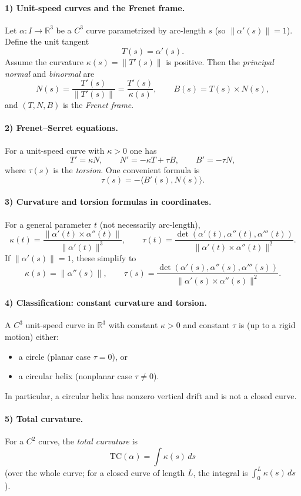 \documentclass[12pt,a4paper]{article}
\theoremstyle{plain}
\theoremstyle{definition}      %
\begin{document}
	\paragraph{1) Unit-speed curves and the Frenet frame.}
	Let $\alpha:I\to\mathbb{R}^3$ be a $C^3$ curve parametrized by arc-length $s$ (so $\|\alpha'(s)\|=1$).
	Define the unit tangent
	\[
	T(s)=\alpha'(s).
	\]
	Assume the curvature $\kappa(s)=\|T'(s)\|$ is positive. Then the \emph{principal normal} and \emph{binormal} are
	\[
	N(s)=\frac{T'(s)}{\|T'(s)\|}=\frac{T'(s)}{\kappa(s)},
	\qquad
	B(s)=T(s)\times N(s),
	\]
	and $(T,N,B)$ is the \emph{Frenet frame}.
	
	\paragraph{2) Frenet--Serret equations.}
	For a unit-speed curve with $\kappa>0$ one has
	\[
	T'=\kappa N,\qquad
	N'=-\kappa T+\tau B,\qquad
	B'=-\tau N,
	\]
	where $\tau(s)$ is the \emph{torsion}. One convenient formula is
	\[
	\tau(s) = -\langle B'(s),N(s)\rangle.
	\]
	
	\paragraph{3) Curvature and torsion formulas in coordinates.}
	For a general parameter $t$ (not necessarily arc-length),
	\[
	\kappa(t)=\frac{\|\alpha'(t)\times\alpha''(t)\|}{\|\alpha'(t)\|^3},
	\qquad
	\tau(t)=\frac{\det(\alpha'(t),\alpha''(t),\alpha'''(t))}{\|\alpha'(t)\times\alpha''(t)\|^2}.
	\]
	If $\|\alpha'(s)\|=1$, these simplify to
	\[
	\kappa(s)=\|\alpha''(s)\|,
	\qquad
	\tau(s)=\frac{\det(\alpha'(s),\alpha''(s),\alpha'''(s))}{\|\alpha'(s)\times\alpha''(s)\|^2}.
	\]
	
	\paragraph{4) Classification: constant curvature and torsion.}
	A $C^3$ unit-speed curve in $\mathbb{R}^3$ with constant $\kappa>0$ and constant $\tau$ is (up to a rigid motion)
	either:
	\begin{itemize}
		\item a circle (planar case $\tau=0$), or
		\item a circular helix (nonplanar case $\tau\neq 0$).
	\end{itemize}
	In particular, a circular helix has nonzero vertical drift and is not a closed curve.
	
	\paragraph{5) Total curvature.}
	For a $C^2$ curve, the \emph{total curvature} is
	\[
	\mathrm{TC}(\alpha)=\int \kappa(s)\,ds
	\]
	(over the whole curve; for a closed curve of length $L$, the integral is $\int_0^L \kappa(s)\,ds$).
	
\end{document}
